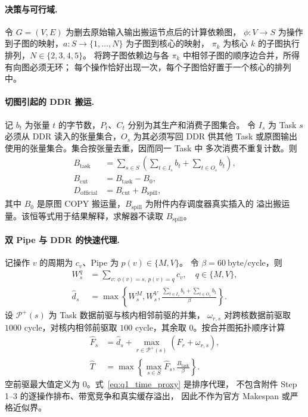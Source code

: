 \paragraph{决策与可行域.}
令 $G=(V,E)$ 为删去原始输入输出搬运节点后的计算依赖图，
$\phi:V\to S$ 为操作到子图的映射，$a:S\to\{1,\ldots,N\}$ 为子图到核心的映射，
$\pi_k$ 为核心 $k$ 的子图执行排列，$N\in\{2,3,4,5\}$。
将跨子图依赖边与各 $\pi_k$ 中相邻子图的顺序边合并，所得有向图必须无环；
每个操作恰好出现一次，每个子图恰好置于一个核心的排列中。

\paragraph{切图引起的 DDR 搬运.}
记 $b_t$ 为张量 $t$ 的字节数，$P_t$、$C_t$ 分别为其生产和消费子图集合。
令 $I_s$ 为 Task $s$ 必须从 DDR 读入的张量集合，$O_s$ 为其必须写回 DDR
供其他 Task 或原图输出使用的张量集合。集合按张量去重，因而同一 Task 中
多次消费不重复计数。则
\begin{align}
B_{\mathrm{task}}
 &=\sum_{s\in S}\left(\sum_{t\in I_s}b_t+\sum_{t\in O_s}b_t\right),\\
B_{\mathrm{cut}}&=B_{\mathrm{task}}-B_0,\\
D_{\mathrm{official}}&=B_{\mathrm{cut}}+B_{\mathrm{spill}},
\end{align}
其中 $B_0$ 是原图 COPY 搬运量，$B_{\mathrm{spill}}$ 为附件内存调度器真实插入的
溢出搬运量。该恒等式用于结果解释，求解器不读取 $B_{\mathrm{spill}}$。

\paragraph{双 Pipe 与 DDR 的快速代理.}
记操作 $v$ 的周期为 $c_v$、Pipe 为 $p(v)\in\{M,V\}$。
令 $\beta=60\ \mathrm{byte/cycle}$，则
\begin{align}
W_s^q&=\sum_{v:\,\phi(v)=s,\,p(v)=q}c_v,\quad q\in\{M,V\},\\
\widehat d_s&=\max\left\{W_s^M,W_s^V,
\frac{\sum_{t\in I_s}b_t+\sum_{t\in O_s}b_t}{\beta}\right\}.\label{eq:q1_task_proxy}
\end{align}
设 $\mathcal P^+(s)$ 为 Task 数据前驱与核内相邻前驱的并集，
$\omega_{r,s}$ 对跨核数据前驱取 $1000$ cycle，对核内相邻前驱取
$100$ cycle，其余取 $0$。按合并图拓扑顺序计算
\begin{align}
\widehat F_s&=\widehat d_s+
\max_{r\in\mathcal P^+(s)}(\widehat F_r+\omega_{r,s}),\\
\widehat T&=\max\left\{\max_{s\in S}\widehat F_s,
\frac{B_{\mathrm{task}}}{\beta}\right\}.\label{eq:q1_time_proxy}
\end{align}
空前驱最大值定义为 $0$。式~\eqref{eq:q1_time_proxy} 是排序代理，
不包含附件 Step 1--3 的逐操作排布、带宽竞争和真实缓存溢出，
因此不作为官方 Makespan 或严格近似界。


